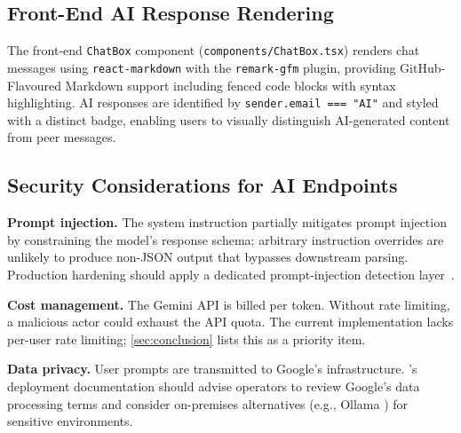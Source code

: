 \subsection{Front-End AI Response Rendering}

The front-end \texttt{ChatBox} component (\texttt{components/ChatBox.tsx})
renders chat messages using \texttt{react-markdown} with the
\texttt{remark-gfm} plugin, providing GitHub-Flavoured Markdown support
including fenced code blocks with syntax highlighting. AI responses are
identified by \texttt{sender.email === "AI"} and styled with a distinct badge,
enabling users to visually distinguish AI-generated content from peer messages.

\subsection{Security Considerations for AI Endpoints}

\textbf{Prompt injection.}
The system instruction partially mitigates prompt injection by constraining
the model's response schema; arbitrary instruction overrides are unlikely to
produce non-JSON output that bypasses downstream parsing. Production hardening
should apply a dedicated prompt-injection detection layer~\cite{greshake2023indirect}.

\textbf{Cost management.}
The Gemini API is billed per token. Without rate limiting, a malicious actor
could exhaust the API quota. The current implementation lacks per-user rate
limiting; \cref{sec:conclusion} lists this as a priority item.

\textbf{Data privacy.}
User prompts are transmitted to Google's infrastructure. \echoray{}'s
deployment documentation should advise operators to review Google's data
processing terms and consider on-premises alternatives (e.g., Ollama
\cite{ollama2024}) for sensitive environments.
